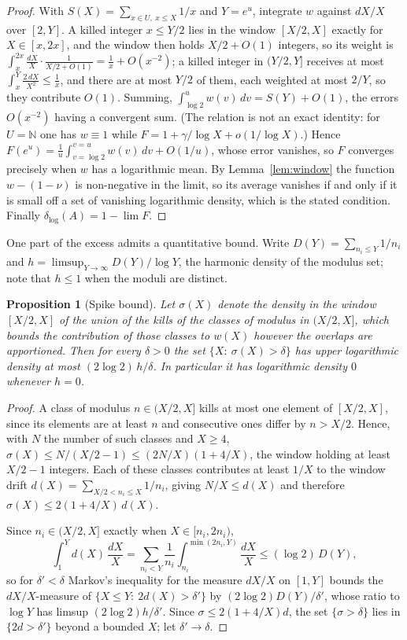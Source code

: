 \documentclass[11pt]{article}
\theoremstyle{plain}
\newtheorem{proposition}[theorem]{Proposition}
\theoremstyle{definition}
\newcommand{\N}{\mathbb{N}}
\newcommand{\dlog}{\delta_{\log}}
\begin{document}
\begin{proof}
With $S(X)=\sum_{x\in U,\ x\le X}1/x$ and $Y=e^u$, integrate
$w$ against $dX/X$ over $[2,Y]$.  A killed integer $x\le Y/2$
lies in the window $[X/2,X]$ exactly for $X\in[x,2x]$, and the
window then holds $X/2+O(1)$ integers, so its weight is
$\int_x^{2x}\frac{dX}{X}\cdot\frac{1}{X/2+O(1)}
=\frac1x+O(x^{-2})$; a killed integer in $(Y/2,Y]$ receives at
most $\int_x^{Y}\frac{2\,dX}{X^2}\le\frac1x$, and there are at
most $Y/2$ of them, each weighted at most $2/Y$, so they
contribute $O(1)$.  Summing, $\int_{\log2}^u w(v)\,dv
=S(Y)+O(1)$, the errors $O(x^{-2})$ having a convergent sum.
(The relation is not an exact identity: for $U=\N$ one has
$w\equiv1$ while $F=1+\gamma/\log X+o(1/\log X)$.)  Hence
$F(e^u)=\frac{1}{u}\int_{v=\log 2}^{v=u} w(v)\,dv+O(1/u)$, whose error vanishes, so $F$
converges precisely when $w$ has a logarithmic mean.  By
Lemma~\ref{lem:window} the function $w-(1-\nu)$ is
non-negative in the limit, so its average vanishes if and only
if it is small off a set of vanishing logarithmic density, which
is the stated condition.  Finally $\dlog(A)=1-\lim F$.
\end{proof}

One part of the excess admits a quantitative bound.  Write
$D(Y)=\sum_{n_i\le Y}1/n_i$ and
$h=\limsup_{Y\to\infty}D(Y)/\log Y$, the harmonic density of the
modulus set; note that $h\le1$ when the moduli are distinct.

\begin{proposition}[Spike bound]\label{prop:spike}
Let $\sigma(X)$ denote the density in the window $[X/2,X]$ of
the union of the kills of the classes of modulus in $(X/2,X]$,
which bounds the contribution of those classes to $w(X)$ however
the overlaps are apportioned.  Then for every $\delta>0$ the set
$\{X:\ \sigma(X)>\delta\}$ has upper logarithmic density at most
$(2\log2)\,h/\delta$.  In particular it has logarithmic density
$0$ whenever $h=0$.
\end{proposition}

\begin{proof}
A class of modulus $n\in(X/2,X]$ kills at most one element of
$[X/2,X]$, since its elements are at least $n$ and consecutive
ones differ by $n>X/2$.  Hence, with $N$ the number of such
classes and $X\ge4$, $\sigma(X)\le N/(X/2-1)\le(2N/X)(1+4/X)$,
the window holding at least $X/2-1$ integers.  Each of these
classes contributes at least $1/X$ to the window drift
$d(X)=\sum_{X/2<n_i\le X}1/n_i$, giving $N/X\le d(X)$ and
therefore $\sigma(X)\le2(1+4/X)\,d(X)$.

Since $n_i\in(X/2,X]$ exactly when $X\in[n_i,2n_i)$,
\[
\int_1^Y d(X)\,\frac{dX}{X}
=\sum_{n_i<Y}\frac1{n_i}\int_{n_i}^{\min(2n_i,Y)}\frac{dX}{X}
\le(\log2)\,D(Y),
\]
so for $\delta'<\delta$ Markov's inequality for the measure
$dX/X$ on $[1,Y]$ bounds the $dX/X$-measure of
$\{X\le Y:\ 2d(X)>\delta'\}$ by $(2\log2)D(Y)/\delta'$, whose
ratio to $\log Y$ has limsup $(2\log2)h/\delta'$.  Since
$\sigma\le2(1+4/X)d$, the set $\{\sigma>\delta\}$ lies in
$\{2d>\delta'\}$ beyond a bounded $X$; let $\delta'\to\delta$.
\end{proof}
\end{document}
